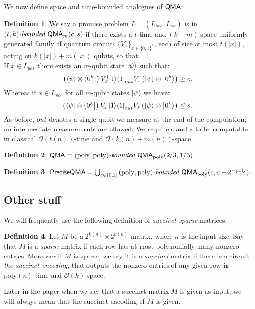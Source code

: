 \documentclass[11pt]{article}
\theoremstyle{definition}
\theoremstyle{remark}
\theoremstyle{definition}
\newtheorem{definition}{Definition}
\newcommand\QMA{{\sf{QMA}}}
\newcommand\QMAexp{{\sf{PreciseQMA}}}
\newcommand\bddQMA[5]{{\left(#1,#2\right)}\textit{-bounded }\QMA_{#3}(#4,#5)}
\newcommand\bigoh{\mathcal{O}}
\newcommand{\poly}{\textrm{poly}}
\begin{document}
We now define space and time-bounded analogues of $\QMA$:
\begin{definition}We say a promise problem $L=(L_{yes},L_{no})$ is in $\bddQMA{t}{k}{m}{c}{s}$ if there exists a $t$ time and $(k+m)$ space uniformly generated family of quantum circuits $\{ V_x\}_{x\in\{0,1\}^*}$, each of size at most $t(|x|)$, acting on $k(|x|)+m(|x|)$ qubits, so that:\\

If $x \in L_{yes}$ there exists an $m$-qubit state ${\left\vert{\psi}\right\rangle}$ such that:
\begin{equation}
\left({\left\langle{\psi}\right\vert}\otimes {\left\langle{0^k}\right\vert}\right) V^\dagger_x {\left\vert{1}\right\rangle}{\left\langle{1}\right\vert}_{out} V_x \left({\left\vert{\psi}\right\rangle}\otimes {\left\vert{0^k}\right\rangle}\right) \ge c.
\end{equation}
Whereas if $x \in L_{no}$, for all $m$-qubit states ${\left\vert{\psi}\right\rangle}$ we have:
\begin{equation}
\left({\left\langle{\psi}\right\vert}\otimes {\left\langle{0^k}\right\vert}\right) V^\dagger_x {\left\vert{1}\right\rangle}{\left\langle{1}\right\vert}_{out} V_x \left({\left\vert{\psi}\right\rangle}\otimes {\left\vert{0^k}\right\rangle}\right) \le s.
\end{equation}
As before, $out$ denotes a single qubit we measure at the end of the computation; no intermediate measurements are allowed.  
We require $c$ and $s$ to be computable in classical $\bigoh(t(n))$-time and $\bigoh(k(n)+m(n))$-space.
  \end{definition}

\begin{definition} $\QMA=\bddQMA{\poly}{\poly}{\poly}{2/3}{1/3}$.
\end{definition}
\begin{definition} $\QMAexp=\bigcup_{c \in (0,1]}\bddQMA{\poly}{\poly}{\poly}{c}{c-2^{-\poly}}$.
\end{definition}

\subsection{Other stuff}
We will frequently use the following definition of \emph{succinct sparse} matrices.
\begin{definition}
Let $M$ be a $2^{k(n)} \times 2^{k(n)}$ matrix, where $n$ is the input size. Say that $M$ is a \emph{sparse} matrix if each row has at most polynomially many nonzero entries. Moreover if $M$ is sparse, we say it is a \emph{succinct} matrix if there is a circuit, \emph{the succinct encoding}, that outputs the nonzero entries of any given row in $\poly(n)$ time and $\mathcal{O}(k)$ space.
\end{definition}
Later in the paper when we say that a succinct matrix $M$ is given as input, we will always mean that the succinct encoding of $M$ is given.
\end{document}
